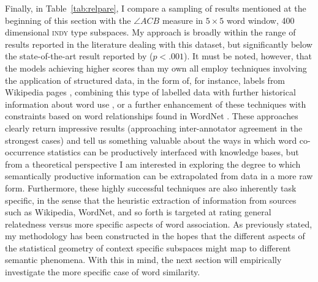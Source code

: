 Finally, in Table~\ref{tab:relpare}, I compare a sampling of results mentioned at the beginning of this section with the $\angle ACB$ measure in $5 \times 5$ word window, 400 dimensional \textsc{indy} type subspaces.  My approach is broadly within the range of results reported in the literature dealing with this dataset, but significantly below the state-of-the-art result reported by \cite{HalawiEA2012} ($p < .001$).  It must be noted, however, that the models achieving higher scores than my own all employ techniques involving the application of structured data, in the form of, for instance, labels from Wikipedia pages \citep{GabrilovichEA2007}, combining this type of labelled data with further historical information about word use \citep{RadinskyEA2011}, or a further enhancement of these techniques with constraints based on word relationships found in WordNet \citep{HalawiEA2012}.  These approaches clearly return impressive results (approaching inter-annotator agreement in the strongest cases) and tell us something valuable about the ways in which word co-occurrence statistics can be productively interfaced with knowledge bases, but from a theoretical perspective I am interested in exploring the degree to which semantically productive information can be extrapolated from data in a more raw form.  Furthermore, these highly successful techniques are also inherently task specific, in the sense that the heuristic extraction of information from sources such as Wikipedia, WordNet, and so forth is targeted at rating general relatedness versus more specific aspects of word association.  As previously stated, my methodology has been constructed in the hopes that the different aspects of the statistical geometry of context specific subspaces might map to different semantic phenomena.  With this in mind, the next section will empirically investigate the more specific case of word similarity.


